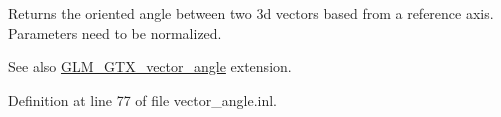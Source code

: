 Returns the oriented angle between two 3d vectors based from a reference axis. Parameters need to be normalized. \begin{DoxySeeAlso}{See also}
\hyperlink{group__gtx__vector__angle}{G\+L\+M\+\_\+\+G\+T\+X\+\_\+vector\+\_\+angle} extension. 
\end{DoxySeeAlso}


Definition at line 77 of file vector\+\_\+angle.\+inl.

